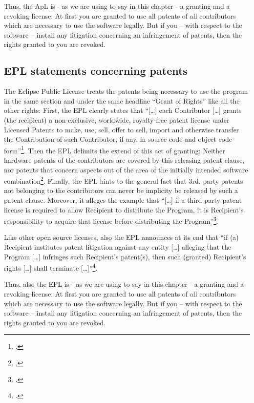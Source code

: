 Thus, the ApL is - as we are using to say in this chapter - a granting and a
revoking license: At first you are granted to use all patents of all
contributors which are necessary to use the software legally. But if you -- with
respect to the software -- install any litigation concerning an infringement of
patents, then the rights granted to you are revoked.


\subsection{EPL statements concerning patents}\label{subsec:EpLPatentClause}

The Eclipse Public License treats the patents being necessary to use the program
in the same section and under the same headline \enquote{Grant of Rights} like
all the other rights: First, the EPL clearly states that \enquote{[\ldots] each
Contributor [\ldots] grants (the recipient) a non-exclusive, worldwide,
royalty-free patent license under Licensed Patents to make, use, sell, offer to
sell, import and otherwise transfer the Contribution of such Contributor, if
any, in source code and object code form}\footcite[cf.][\nopage wp.
§2.b]{Epl10OsiLicense2005a}. Then the EPL delimits the extend of this act of
granting: Neither hardware patents of the contributors are covered by this
releasing patent clause, nor patents that concern aspects out of the area of the
initially intended software combination\footcite[cf.][\nopage wp.
§2.b]{Epl10OsiLicense2005a}. Finally, the EPL hints to the general fact that
3rd. party patents not belonging to the contributors can never be implicity be
released by such a patent clause. Moreover, it alleges the example that
\enquote{[\ldots] if a third party patent license is required to allow Recipient
to distribute the Program, it is Recipient's responsibility to acquire that
license before distributing the Program}\footcite[cf.][\nopage wp.
§2.c]{Epl10OsiLicense2005a}.

Like other open source licenses, also the EPL announces at its end that
\enquote{if (a) Recipient institutes patent litigation against any entity
[\ldots] alleging that the Program [\ldots] infringes such Recipient's
patent(s), then such (granted) Recipient's rights [\ldots] shall terminate
[\ldots]}\footcite[cf.][\nopage wp. §7]{Epl10OsiLicense2005a}.

Thus, also the EPL is - as we are using to say in this chapter - a granting and
a revoking license: At first you are granted to use all patents of all
contributors which are necessary to use the software legally. But if you -- with
respect to the software -- install any litigation concerning an infringement of
patents, then the rights granted to you are revoked.

